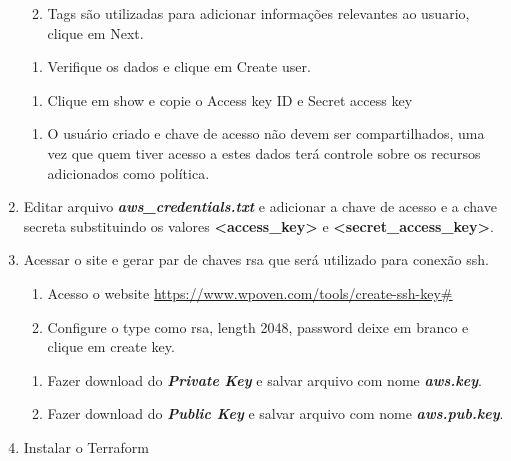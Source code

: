 \begin{enumerate}
  \begin{enumerate}
  \def\labelenumii{\arabic{enumii}.}
  \setcounter{enumii}{4}
  \tightlist
  \item
    Tags são utilizadas para adicionar informações relevantes ao
    usuario, clique em Next.
  \end{enumerate}

  \begin{enumerate}
  \def\labelenumii{\arabic{enumii}.}
  \setcounter{enumii}{5}
  \tightlist
  \item
    Verifique os dados e clique em Create user.
  \end{enumerate}

  \begin{enumerate}
  \def\labelenumii{\arabic{enumii}.}
  \setcounter{enumii}{6}
  \tightlist
  \item
    Clique em show e copie o Access key ID e Secret access key
  \end{enumerate}

  \begin{enumerate}
  \def\labelenumii{\arabic{enumii}.}
  \setcounter{enumii}{7}
  \tightlist
  \item
    O usuário criado e chave de acesso não devem ser compartilhados, uma
    vez que quem tiver acesso a estes dados terá controle sobre os
    recursos adicionados como política.
  \end{enumerate}
\item
  Editar arquivo \textbf{\emph{aws\_credentials.txt}} e adicionar a
  chave de acesso e a chave secreta substituindo os valores
  \textbf{\textless access\_key\textgreater{}} e
  \textbf{\textless secret\_access\_key\textgreater{}}.
\item
  Acessar o site e gerar par de chaves rsa que será utilizado para
  conexão ssh.

  \begin{enumerate}
  \def\labelenumii{\arabic{enumii}.}
  \item
    Acesso o website
    \href{https://www.wpoven.com/tools/create-ssh-key}{https://www.wpoven.com/tools/create-ssh-key\#}
  \item
    Configure o type como rsa, length 2048, password deixe em branco e
    clique em create key.
  \end{enumerate}

  \begin{enumerate}
  \def\labelenumii{\arabic{enumii}.}
  \setcounter{enumii}{2}
  \item
    Fazer download do \textbf{\emph{Private Key}} e salvar arquivo com
    nome \textbf{\emph{aws.key}}.
  \item
    Fazer download do \textbf{\emph{Public Key}} e salvar arquivo com
    nome \textbf{\emph{aws.pub.key}}.
  \end{enumerate}
\item
  Instalar o Terraform


\end{enumerate}
